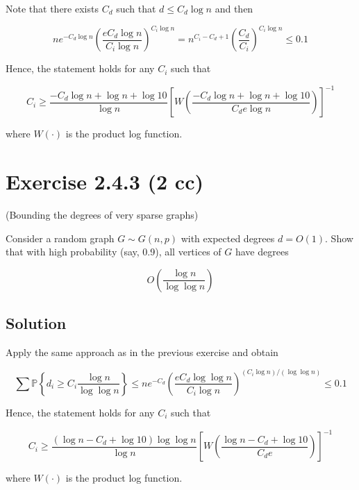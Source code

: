 \documentclass{article}
\begin{document}
Note that there exists $C_d$ such that $d \leq C_d \log n$ and then

$$n e^{-C_d \log n} \left(\frac{e C_d \log n}{C_i \log n}\right)^{C_i \log n} = n^{C_i - C_d + 1} \left(\frac{C_d}{C_i}\right)^{C_i \log n} \leq 0.1$$

Hence, the statement holds for any $C_i$ such that

$$C_i \geq \frac{-C_d \log n + \log n + \log 10}{\log n } \left[W \left(\frac{-C_d \log n + \log n + \log 10}{C_d e \log n}\right)\right]^{-1}$$

where $W(\cdot)$ is the product log function.

\section{Exercise 2.4.3 (2 cc)}

(Bounding the degrees of very sparse graphs)

Consider a random graph $G \sim G(n, p)$ with expected degrees $d = O(1)$. Show that with high probability (say, 0.9), all vertices of $G$ have degrees

$$O\left(\frac{\log n}{\log \log n}\right)$$

\subsection{Solution}

Apply the same approach as in the previous exercise and obtain

$$ \sum \mathbb P \left\{ d_i \geq C_i \frac{\log n}{\log \log n} \right\} \leq n e^{-C_d} \left(\frac{e C_d \log \log n}{C_i \log n}\right)^{(C_i \log n) / (\log \log n)} \leq 0.1$$

Hence, the statement holds for any $C_i$ such that

$$C_i \geq \frac{(\log n - C_d + \log 10)\log \log n}{\log n} \left[W\left( \frac{\log n - C_d + \log 10}{C_d e} \right)\right]^{-1}$$

where $W(\cdot)$ is the product log function.
\end{document}
